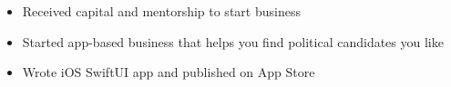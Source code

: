 \documentclass[10pt,a4paper,ragged2e,withhyper]{altacv}
\begin{document}
    \begin{paracol}{2}






        \newpage

        \switchcolumn

            \begin{itemize}
                \item Received capital and mentorship to start business
                \item Started app-based business that helps you find political candidates you like
                \item Wrote iOS SwiftUI app and published on App Store
            \end{itemize}
            \divider


\end{paracol}
\end{document}
